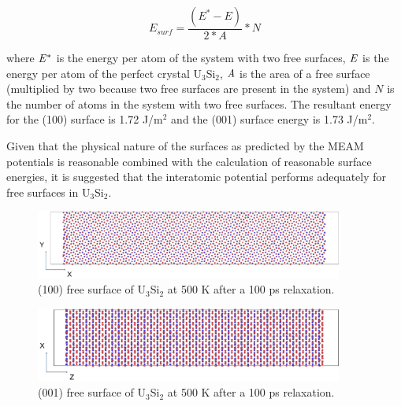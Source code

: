 \documentclass[review]{elsarticle}
\begin{document}
\begin{equation}
\label{eq:surface}
E_{surf}= \frac{(E^{*} - E)}{2*A} * N
\end{equation}

where $\it{E^{*}}$ is the energy per atom of the system with two free surfaces, $\it{E}$ is the energy per atom of the perfect crystal U$_{3}$Si$_{2}$, $\it{A}$ is the area of a free surface (multiplied by two because two free surfaces are present in the system) and $\textit{N}$ is the number of atoms in the system with two free surfaces.  The resultant energy for the (100) surface is 1.72 J/m$^{2}$ and the (001) surface energy is 1.73 J/m$^{2}$.  

Given that the physical nature of the surfaces as predicted by the MEAM potentials is reasonable combined with the calculation of reasonable surface energies, it is suggested that the interatomic potential performs adequately for free surfaces in U$_{3}$Si$_{2}$.  

\begin{figure}[bt]
	\centering
	\includegraphics[width=0.9\textwidth]{100KK1a.png}
    \caption{(100) free surface of U$_{3}$Si$_{2}$ at 500 K after a 100 ps relaxation.}\label{fig:ben7}
\end{figure}

\begin{figure}[bt]
	\centering
	\includegraphics[width=0.9\textwidth]{001KK1a.png}
    \caption{(001) free surface of U$_{3}$Si$_{2}$ at 500 K after a 100 ps relaxation. }\label{fig:ben8}
\end{figure}
\end{document}
